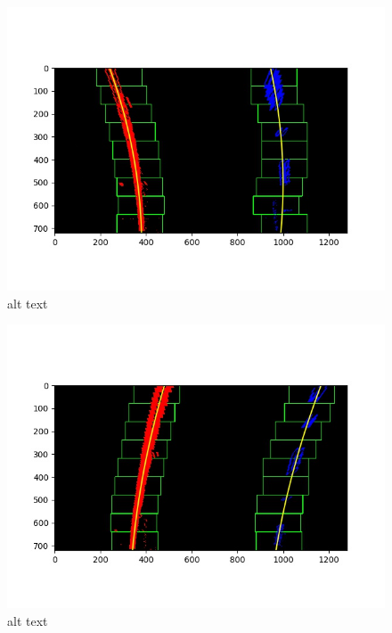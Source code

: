 \documentclass[11pt]{article}
\makeatletter
\def\maxwidth{\ifdim\Gin@nat@width>\linewidth\linewidth
    \else\Gin@nat@width\fi}
\let\Oldincludegraphics\includegraphics
\renewcommand{\includegraphics}[1]{\Oldincludegraphics[width=.8\maxwidth]{#1}}
\makeatother
\begin{document}
\begin{figure}
\centering
\includegraphics{./output_images/general_sliding_window/lines_Identified_test2.jpg}
\caption{alt text}
\end{figure}

\begin{figure}
\centering
\includegraphics{./output_images/general_sliding_window/lines_Identified_test3.jpg}
\caption{alt text}
\end{figure}
\end{document}
